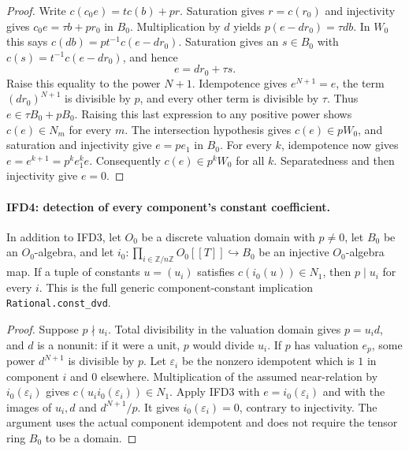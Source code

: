 \documentclass[11pt,a4paper]{article}
\numberwithin{equation}{section}
\theoremstyle{remark}\newtheorem{remark}[theorem]{Remark}
\begin{document}
\begin{proof}
Write $c(c_0e)=tc(b)+pr$. Saturation gives $r=c(r_0)$ and
injectivity gives $c_0e=\tau b+pr_0$ in $B_0$.
Multiplication by $d$ yields
$p(e-dr_0)=\tau db$. In $W_0$ this says
$c(db)=p t^{-1}c(e-dr_0)$. Saturation gives an $s\in B_0$ with
$c(s)=t^{-1}c(e-dr_0)$, and hence
\[
                              e=dr_0+\tau s.
\]
Raise this equality to the power $N+1$. Idempotence gives
$e^{N+1}=e$, the term $(dr_0)^{N+1}$ is divisible by $p$, and every
other term is divisible by $\tau$. Thus $e\in\tau B_0+pB_0$.
Raising this last expression to any positive power shows
$c(e)\in N_m$ for every $m$. The intersection hypothesis gives
$c(e)\in pW_0$, and saturation and injectivity give $e=pe_1$ in $B_0$.
For every $k$, idempotence now gives
$e=e^{k+1}=p^ke_1^ke$. Consequently $c(e)\in p^kW_0$ for all $k$.
Separatedness and then injectivity give $e=0$.
\end{proof}

\paragraph{IFD4: detection of every component's constant coefficient.}
\label{claim:IFD4}
In addition to IFD3, let $O_0$ be a discrete valuation domain with
$p\ne0$, let $B_0$ be an $O_0$-algebra, and let
$i_0:\prod_{i\in\mathbb Z/n\mathbb Z}O_0[[T]]\hookrightarrow B_0$
be an injective $O_0$-algebra map.
If a tuple of constants $u=(u_i)$ satisfies
$c(i_0(u))\in N_1$, then $p\mid u_i$ for every $i$.
This is the full generic component-constant implication
\texttt{Rational.\allowbreak const\_\allowbreak dvd}.

\begin{proof}
Suppose $p\nmid u_i$. Total divisibility in the valuation domain gives
$p=u_i d$, and $d$ is a nonunit: if it were a unit, $p$ would divide
$u_i$. If $p$ has valuation $e_p$, some power $d^{N+1}$ is divisible
by $p$. Let $\varepsilon_i$ be the nonzero idempotent which is $1$
in component $i$ and $0$ elsewhere. Multiplication of the assumed
near-relation by $i_0(\varepsilon_i)$ gives
$c(u_i i_0(\varepsilon_i))\in N_1$. Apply IFD3 with
$e=i_0(\varepsilon_i)$ and with the images of $u_i,d$ and
$d^{N+1}/p$. It gives $i_0(\varepsilon_i)=0$, contrary to injectivity.
The argument uses the actual component idempotent and does not require
the tensor ring $B_0$ to be a domain.
\end{proof}

\end{document}

